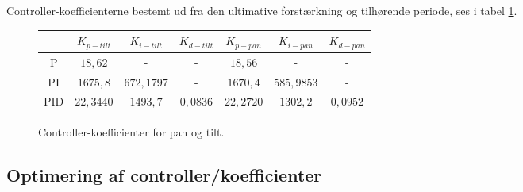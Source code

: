Controller-koefficienterne bestemt ud fra den ultimative forstærkning og tilhørende periode, ses i tabel \ref{tb:ZieglerNichols1}.

\begin{figure}[th!]
\centering
\begin{tabular}{c|c|c|c|c|c|c}
&\(K_{p-tilt}\) & \(K_{i-tilt}\) & \(K_{d-tilt}\)&\(K_{p-pan}\) & \(K_{i-pan}\) & \(K_{d-pan}\)\\\hline
P&\(18,62\) &-&-&\(18,56\)&-&-\\
PI&\(1675,8\) & \( 672,1797\) &-&\(1670,4\) & \( 585,9853  \) &-\\
PID&\(22,3440 \) &  \( 1493,7 \) & \(0,0836  \)&\(22,2720 \) &  \( 1302,2 \) & \(0,0952  \)
\end{tabular}
\captionsetup{type=table}
\caption[Controller-koefficienter, Ziegler-Nichols Tuning Methode]{Controller-koefficienter for pan og tilt.}\label{tb:ZieglerNichols1}
\end{figure}



\subsection{Optimering af controller/koefficienter}
